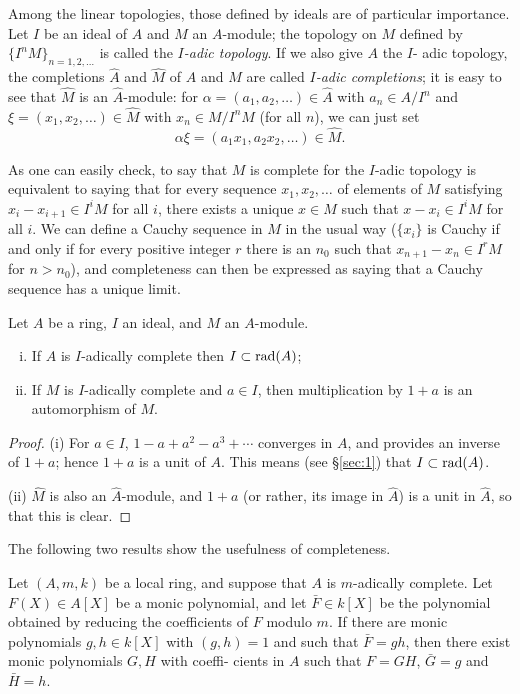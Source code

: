 Among the linear topologies, those defined by ideals are of particular
importance. Let $I$ be an ideal of $A$ and $M$ an $A$-module; the topology on $M$
defined by $\{I^nM\}_{n=1,2,\ldots}$ is called the \emph{$I$-adic topology}. If we also give $A$ the $I$-
adic topology, the completions $\hat{A}$ and $\hat{M}$ of $A$ and $M$ are called \emph{$I$-adic
completions}; it is easy to see that $\hat{M}$ is an $\hat{A}$-module: for $\alpha = (a_1, a_2, \ldots)
\in \hat{A}$ with $a_n \in A/I^n$ and $\xi = (x_1, x_2, \ldots) \in \hat{M}$ with $x_n \in M/I^nM$ (for all $n$), we can
just set
\[
  \alpha\xi = (a_1x_1, a_2x_2, \ldots) \in \hat{M}.
\]

As one can easily check, to say that $M$ is complete for the $I$-adic topology is
equivalent to saying that for every sequence $x_1, x_2, \ldots$ of elements of $M$
satisfying $x_i - x_{i+1} \in I^iM$ for all $i$, there exists a unique $x \in M$ such that
$x - x_i \in I^iM$ for all $i$. We can define a Cauchy sequence in $M$ in the usual
way ($\{x_i\}$ is Cauchy if and only if for every positive integer $r$ there is an
$n_0$ such that $x_{n+1} - x_n \in I^rM$ for $n > n_0$), and completeness can then be
expressed as saying that a Cauchy sequence has a unique limit.

\begin{theorem}\label{thm:8.2}
Let $A$ be a ring, $I$ an ideal, and $M$ an $A$-module.
\begin{enumerate}[(i)]
  \item If $A$ is $I$-adically complete then $I \subset \operatorname{rad}(A)$;
  \item If $M$ is $I$-adically complete and $a \in I$, then multiplication by $1 + a$ is an
        automorphism of $M$.
\end{enumerate}
\end{theorem}

\begin{proof}
(i) For $a \in I$, $1 - a + a^2 - a^3 + \cdots$ converges in $A$, and provides an
inverse of $1 + a$; hence $1 + a$ is a unit of $A$. This means (see \S\ref{sec:1}) that
$I \subset \operatorname{rad}(A)$.

(ii) $\hat{M}$ is also an $\hat{A}$-module, and $1 + a$ (or rather, its image in $\hat{A}$) is a unit in
$\hat{A}$, so that this is clear.
\end{proof}

The following two results show the usefulness of completeness.

\begin{theorem}\label{thm:8.3}
Let $(A, m, k)$ be a local ring, and suppose
that $A$ is $m$-adically complete. Let $F(X) \in A[X]$ be a monic polynomial, and
let $\bar{F} \in k[X]$ be the polynomial obtained by reducing the coefficients of $F$
modulo $m$. If there are monic polynomials $g, h \in k[X]$ with $(g, h) = 1$
and such that $\bar{F} = gh$, then there exist monic polynomials $G, H$ with coeffi-
cients in $A$ such that $F = GH$, $\bar{G} = g$ and $\bar{H} = h$.
\end{theorem}

